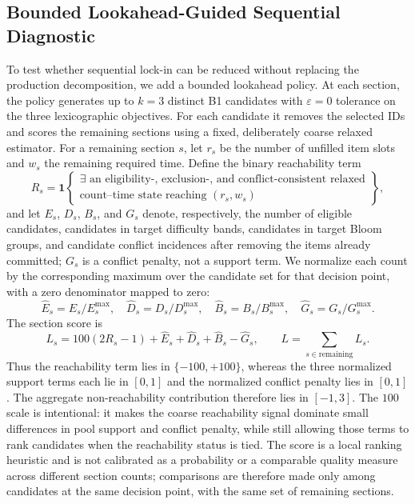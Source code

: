 \documentclass[runningheads]{llncs}
\begin{document}
\subsection{Bounded Lookahead-Guided Sequential Diagnostic}
To test whether sequential lock-in can be reduced without replacing the production decomposition, we add a bounded lookahead policy. At each section, the policy generates up to $k=3$ distinct B1 candidates with $\varepsilon=0$ tolerance on the three lexicographic objectives. For each candidate it removes the selected IDs and scores the remaining sections using a fixed, deliberately coarse relaxed estimator. For a remaining section $s$, let $r_s$ be the number of unfilled item slots and $w_s$ the remaining required time. Define the binary reachability term
\begin{equation}
R_s = \mathbf{1}\left\{\begin{array}{l}
\exists\text{ an eligibility-, exclusion-, and conflict-consistent relaxed}\\[-1mm]
\text{count--time state reaching }(r_s,w_s)
\end{array}\right\},
\end{equation}
and let $E_s$, $D_s$, $B_s$, and $G_s$ denote, respectively, the number of eligible candidates, candidates in target difficulty bands, candidates in target Bloom groups, and candidate conflict incidences after removing the items already committed; $G_s$ is a conflict penalty, not a support term. We normalize each count by the corresponding maximum over the candidate set for that decision point, with a zero denominator mapped to zero:
\begin{equation}
\hat E_s=E_s/E_s^{\max},\quad \hat D_s=D_s/D_s^{\max},\quad \hat B_s=B_s/B_s^{\max},\quad \hat G_s=G_s/G_s^{\max}.
\end{equation}
The section score is
\begin{equation}
L_s = 100(2R_s-1)+\hat E_s+\hat D_s+\hat B_s-\hat G_s,\qquad L=\sum_{s\in\text{remaining}}L_s.
\end{equation}
Thus the reachability term lies in $\{-100,+100\}$, whereas the three normalized support terms each lie in $[0,1]$ and the normalized conflict penalty lies in $[0,1]$. The aggregate non-reachability contribution therefore lies in $[-1,3]$. The $100$ scale is intentional: it makes the coarse reachability signal dominate small differences in pool support and conflict penalty, while still allowing those terms to rank candidates when the reachability status is tied. The score is a local ranking heuristic and is not calibrated as a probability or a comparable quality measure across different section counts; comparisons are therefore made only among candidates at the same decision point, with the same set of remaining sections.
\end{document}
